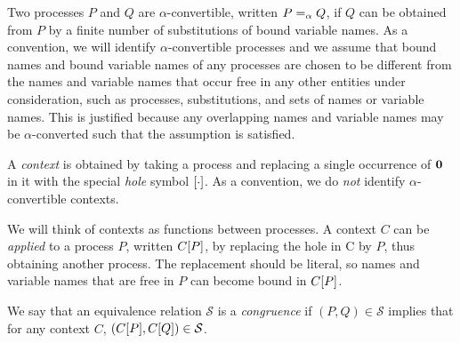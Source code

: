 Two processes \( P \) and \( Q \) are \( \alpha \)-convertible,
written \( P =_{\alpha} Q \), if \( Q \) can be obtained from \( P \)
by a finite number of substitutions of bound variable names.  As a
convention, we will identify \( \alpha \)-convertible processes and we
assume that bound names and bound variable names of any processes are
chosen to be different from the names and variable names that occur
free in any other entities under consideration, such as processes,
substitutions, and sets of names or variable names.  This is justified
because any overlapping names and variable names may be
\( \alpha \)-converted such that the assumption is satisfied.


A \emph{context} is obtained by taking a process and replacing a single occurrence of \( \bm{0} \) in it with the special \emph{hole} symbol \( [\cdot] \).
As a convention, we do \emph{not} identify \( \alpha \)-convertible contexts.

We will think of contexts as functions between processes.
A context \( C \) can be \emph{applied} to a process \( P \), written \( C[P] \), by replacing the hole in C by \( P \), thus obtaining another process.
The replacement should be literal, so names and variable names that are free in \( P \) can become bound in \( C[P] \).

We say that an equivalence relation \( \mathcal{S} \) is a \emph{congruence} if \( (P,Q) \in \mathcal{S} \) implies that for any context \( C \), \( (C[P], C[Q]) \in \mathcal{S} \).
